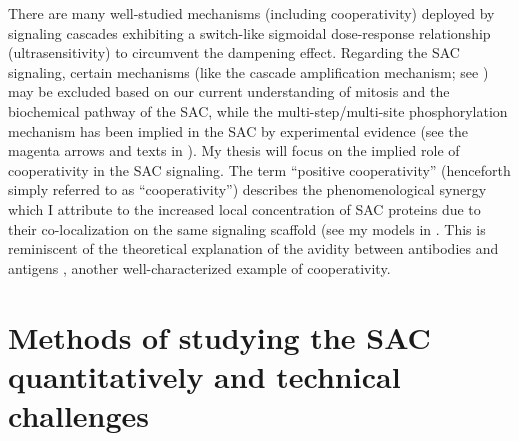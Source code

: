 There are many well-studied mechanisms (including cooperativity) deployed by signaling cascades exhibiting a switch-like sigmoidal dose-response relationship (ultrasensitivity) to circumvent the dampening effect. Regarding the SAC signaling, certain mechanisms (like the cascade amplification mechanism; see ) may be excluded based on our current understanding of mitosis and the biochemical pathway of the SAC, while the multi-step/multi-site phosphorylation mechanism has been implied in the SAC by experimental evidence \cite{MultistepUltrasensitivity, Ji2017eLife} (see the magenta arrows and texts in ). My thesis will focus on the implied role of cooperativity in the SAC signaling. The term ``positive cooperativity'' (henceforth simply referred to as ``cooperativity'') describes the phenomenological synergy which I attribute to the increased local concentration of SAC proteins due to their co-localization on the same signaling scaffold (see my models in . This is reminiscent of the theoretical explanation of the avidity between antibodies and antigens \cite{AvidityMath}, another well-characterized example of cooperativity.

\section{Methods of studying the SAC quantitatively  and technical challenges}


